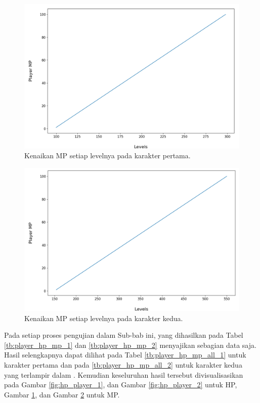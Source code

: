 \begin{figure} [!h] \centering
	\includegraphics[scale=0.42]{img/PlayerMpDistrib1.png}
	\caption{Kenaikan MP setiap levelnya pada karakter pertama.}
	\label{fig:mp_player_1}
\end{figure}

\begin{figure} [!h] \centering
	\includegraphics[scale=0.42]{img/PlayerMpDistrib2.png}
	\caption{Kenaikan MP setiap levelnya pada karakter kedua.}
	\label{fig:mp_player_2}
\end{figure}

Pada setiap proses pengujian dalam Sub-bab ini, yang dihasilkan pada Tabel \ref{tb:player_hp_mp_1} dan \ref{tb:player_hp_mp_2} menyajikan sebagian data saja. Hasil selengkapnya dapat dilihat pada Tabel \ref{tb:player_hp_mp_all_1} untuk karakter pertama dan pada \ref{tb:player_hp_mp_all_2} untuk karakter kedua yang terlampir dalam . Kemudian keseluruhan hasil tersebut divisualisasikan pada Gambar \ref{fig:hp_player_1}, dan Gambar \ref{fig:hp_player_2} untuk HP, Gambar \ref{fig:mp_player_1}, dan Gambar \ref{fig:mp_player_2} untuk MP.
\vspace{1ex}

